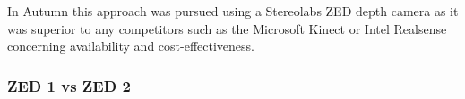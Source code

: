 In Autumn this approach was pursued using a Stereolabs ZED depth camera as it was superior to any competitors such as the Microsoft Kinect or Intel Realsense concerning availability and cost-effectiveness. 

\subsubsection{ZED 1 vs ZED 2}





\filbreak